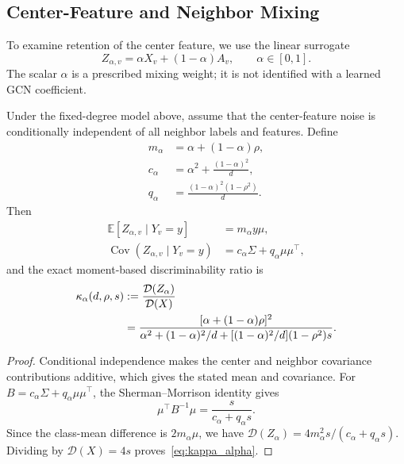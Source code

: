 \subsection{Center-Feature and Neighbor Mixing}

To examine retention of the center feature, we use the linear surrogate
\begin{equation}
    Z_{\alpha,v}=\alpha X_v+(1-\alpha)A_v,
    \qquad \alpha\in[0,1].
    \label{eq:self_neighbor_operator}
\end{equation}
The scalar $\alpha$ is a prescribed mixing weight; it is not identified with a learned GCN coefficient.

\begin{proposition}
\label{prop:self_neighbor_mixing}
Under the fixed-degree model above, assume that the center-feature noise is conditionally independent of all neighbor labels and features. Define
\begin{align}
    m_\alpha &= \alpha+(1-\alpha)\rho,\\
    c_\alpha &= \alpha^2+\frac{(1-\alpha)^2}{d},\\
    q_\alpha &= \frac{(1-\alpha)^2(1-\rho^2)}{d}.
\end{align}
Then
\begin{align}
    \mathbb{E}[Z_{\alpha,v}\mid Y_v=y]
        &=m_\alpha y\mu,\\
    \operatorname{Cov}(Z_{\alpha,v}\mid Y_v=y)
        &=c_\alpha\Sigma+q_\alpha\mu\mu^\top,
\end{align}
and the exact moment-based discriminability ratio is
\begin{align}
    \kappa_\alpha(d,\rho,s)
    &:=\frac{\mathcal{D}(Z_\alpha)}{\mathcal{D}(X)} \notag\\
    &=\frac{[\alpha+(1-\alpha)\rho]^2}
    {\alpha^2+(1-\alpha)^2/d
    +[(1-\alpha)^2/d](1-\rho^2)s}.
    \label{eq:kappa_alpha}
\end{align}
\end{proposition}

\begin{proof}
Conditional independence makes the center and neighbor covariance contributions additive, which gives the stated mean and covariance. For
$B=c_\alpha\Sigma+q_\alpha\mu\mu^\top$, the Sherman--Morrison identity gives
\begin{equation}
    \mu^\top B^{-1}\mu=\frac{s}{c_\alpha+q_\alpha s}.
\end{equation}
Since the class-mean difference is $2m_\alpha\mu$, we have
$\mathcal{D}(Z_\alpha)=4m_\alpha^2s/(c_\alpha+q_\alpha s)$. Dividing by $\mathcal{D}(X)=4s$ proves~\eqref{eq:kappa_alpha}.
\end{proof}

